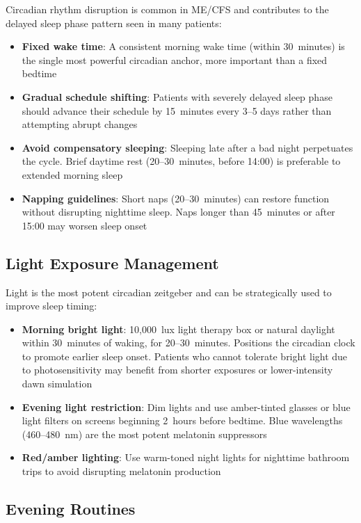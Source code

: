 Circadian rhythm disruption is common in ME/CFS and contributes to the delayed sleep phase pattern seen in many patients:

\begin{itemize}
    \item \textbf{Fixed wake time}: A consistent morning wake time (within 30~minutes) is the single most powerful circadian anchor, more important than a fixed bedtime
    \item \textbf{Gradual schedule shifting}: Patients with severely delayed sleep phase should advance their schedule by 15~minutes every 3--5 days rather than attempting abrupt changes
    \item \textbf{Avoid compensatory sleeping}: Sleeping late after a bad night perpetuates the cycle. Brief daytime rest (20--30~minutes, before 14:00) is preferable to extended morning sleep
    \item \textbf{Napping guidelines}: Short naps (20--30~minutes) can restore function without disrupting nighttime sleep. Naps longer than 45~minutes or after 15:00 may worsen sleep onset
\end{itemize}

\subsection{Light Exposure Management}

Light is the most potent circadian zeitgeber and can be strategically used to improve sleep timing:

\begin{itemize}
    \item \textbf{Morning bright light}: 10,000~lux light therapy box or natural daylight within 30~minutes of waking, for 20--30~minutes. Positions the circadian clock to promote earlier sleep onset. Patients who cannot tolerate bright light due to photosensitivity may benefit from shorter exposures or lower-intensity dawn simulation
    \item \textbf{Evening light restriction}: Dim lights and use amber-tinted glasses or blue light filters on screens beginning 2~hours before bedtime. Blue wavelengths (460--480~nm) are the most potent melatonin suppressors
    \item \textbf{Red/amber lighting}: Use warm-toned night lights for nighttime bathroom trips to avoid disrupting melatonin production
\end{itemize}

\subsection{Evening Routines}

